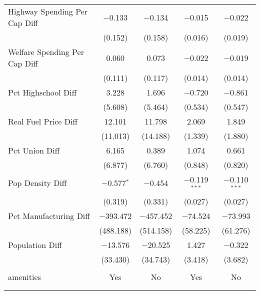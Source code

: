 \begin{table}[!htbp]
\begin{tabular}{@{\extracolsep{5pt}}lcccc}
  Highway Spending Per Cap Diff & $-$0.133 & $-$0.134 & $-$0.015 & $-$0.022 \\ 
  & (0.152) & (0.158) & (0.016) & (0.019) \\ 
  Welfare Spending Per Cap Diff & 0.060 & 0.073 & $-$0.022 & $-$0.019 \\ 
  & (0.111) & (0.117) & (0.014) & (0.014) \\ 
  Pct Highschool Diff & 3.228 & 1.696 & $-$0.720 & $-$0.861 \\ 
  & (5.608) & (5.464) & (0.534) & (0.547) \\ 
  Real Fuel Price Diff & 12.101 & 11.798 & 2.069 & 1.849 \\ 
  & (11.013) & (14.188) & (1.339) & (1.880) \\ 
  Pct Union Diff & 6.165 & 0.389 & 1.074 & 0.661 \\ 
  & (6.877) & (6.760) & (0.848) & (0.820) \\ 
  Pop Density Diff & $-$0.577$^{*}$ & $-$0.454 & $-$0.119$^{***}$ & $-$0.110$^{***}$ \\ 
  & (0.319) & (0.331) & (0.027) & (0.027) \\ 
  Pct Manufacturing Diff & $-$393.472 & $-$457.452 & $-$74.524 & $-$73.993 \\ 
  & (488.188) & (514.158) & (58.225) & (61.276) \\ 
  Population Diff & $-$13.576 & $-$20.525 & 1.427 & $-$0.322 \\ 
  & (33.430) & (34.743) & (3.418) & (3.682) \\ 
 \hline \\[-1.8ex] 
amenities & Yes & No & Yes & No \\ 
\hline \\[-1.8ex] 
\hline 
\hline \\[-1.8ex] 
\end{tabular} 
\end{table} 
